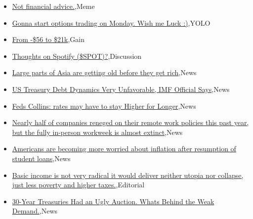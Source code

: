 \documentclass{article}%
\begin{document}
%
\begin{itemize}%
\item%
\href{https://reddit.com/r/wallstreetbets/comments/177kd4t/not\_financial\_advice/}{Not financial advice.},Meme%
\item%
\href{https://reddit.com/r/wallstreetbets/comments/177feu2/gonna\_start\_options\_trading\_on\_monday\_wish\_me\_luck/}{Gonna start options trading on Monday. Wish me Luck :)},YOLO%
\item%
\href{https://reddit.com/r/wallstreetbets/comments/177eyi5/from\_56\_to\_21k/}{From -\$56 to \$21k},Gain%
\item%
\href{https://reddit.com/r/StockMarket/comments/177alif/thoughts\_on\_spotify\_spot/}{Thoughts on Spotify (\$SPOT)?},Discussion%
\item%
\href{https://reddit.com/r/Economics/comments/177ct88/large\_parts\_of\_asia\_are\_getting\_old\_before\_they/}{Large parts of Asia are getting old before they get rich},News%
\item%
\href{https://reddit.com/r/Economics/comments/177bxcl/us\_treasury\_debt\_dynamics\_very\_unfavorable\_imf/}{US Treasury Debt Dynamics Very Unfavorable, IMF Official Says},News%
\item%
\href{https://reddit.com/r/Economics/comments/177667b/feds\_collins\_rates\_may\_have\_to\_stay\_higher\_for/}{Feds Collins: rates may have to stay Higher for Longer},News%
\item%
\href{https://reddit.com/r/Economics/comments/17750to/nearly\_half\_of\_companies\_reneged\_on\_their\_remote/}{Nearly half of companies reneged on their remote work policies this past year, but the fully in-person workweek is almost extinct},News%
\item%
\href{https://reddit.com/r/Economics/comments/1773cln/americans\_are\_becoming\_more\_worried\_about/}{Americans are becoming more worried about inflation after resumption of student loans},News%
\item%
\href{https://reddit.com/r/Economics/comments/1770ixx/basic\_income\_is\_not\_very\_radical\_it\_would\_deliver/}{Basic income is not very radical  it would deliver neither utopia nor collapse, just less poverty and higher taxes.},Editorial%
\item%
\href{https://reddit.com/r/Economics/comments/176yuwo/30year\_treasuries\_had\_an\_ugly\_auction\_whats/}{30-Year Treasuries Had an Ugly Auction. Whats Behind the Weak Demand.},News%
\end{itemize}%
\end{document}
